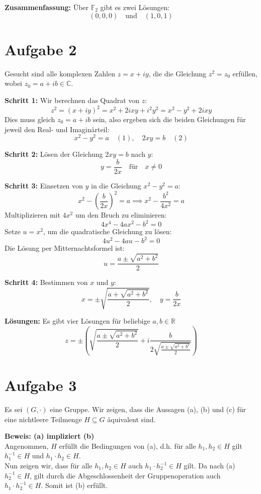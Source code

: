 \documentclass[11pt]{article}
\begin{document}
\textbf{Zusammenfassung:} Über \( \mathbb{F}_2 \) gibt es zwei Lösungen:
\[
(0, 0, 0) \quad \text{und} \quad (1, 0, 1)
\]

\section*{Aufgabe 2}

Gesucht sind alle komplexen Zahlen \( z = x + iy \), die die Gleichung \( z^2 = z_0 \) erfüllen, wobei \( z_0 = a + ib \in \mathbb{C} \).

\textbf{Schritt 1:} Wir berechnen das Quadrat von \( z \):
\[
z^2 = (x + iy)^2 = x^2 + 2ixy + i^2 y^2 = x^2 - y^2 + 2ixy
\]
Dies muss gleich \( z_0 = a + ib \) sein, also ergeben sich die beiden Gleichungen für jeweil den Real- und Imaginärteil:
\[
x^2 - y^2 = a \quad (1), \quad 2xy = b \quad (2)
\]

\textbf{Schritt 2:} Lösen der Gleichung \( 2xy = b \) nach \( y \):
\[
y = \frac{b}{2x} \quad \text{für} \quad x \neq 0
\]

\textbf{Schritt 3:} Einsetzen von \( y \) in die Gleichung \( x^2 - y^2 = a \):
\[
x^2 - \left( \frac{b}{2x} \right)^2 = a \implies x^2 - \frac{b^2}{4x^2} = a
\]
Multiplizieren mit \( 4x^2 \) um den Bruch zu eliminieren:
\[
4x^4 - 4a x^2 - b^2 = 0
\]
Setze \( u = x^2 \), um die quadratische Gleichung zu lösen:
\[
4u^2 - 4a u - b^2 = 0
\]
Die Lösung per Mitternachtsformel ist:
\[
u = \frac{a \pm \sqrt{a^2 + b^2}}{2}
\]

\textbf{Schritt 4:} Bestimmen von \( x \) und \( y \):
\[
x = \pm \sqrt{\frac{a + \sqrt{a^2 + b^2}}{2}}, \quad y = \frac{b}{2x}
\]

\textbf{Lösungen:} Es gibt vier Lösungen für beliebige \( a, b \in \mathbb{R} \)
\[
z = \pm \left( \sqrt{\frac{a \pm \sqrt{a^2 + b^2}}{2}} + i \frac{b}{2 \sqrt{\frac{a \pm \sqrt{a^2 + b^2}}{2}}} \right)
\]

\section*{Aufgabe 3}

Es sei \( (G, \cdot) \) eine Gruppe. Wir zeigen, dass die Aussagen (a), (b) und (c) für eine nichtleere Teilmenge \( H \subseteq G \) äquivalent sind.

\textbf{Beweis: (a) impliziert (b)} \\
Angenommen, \( H \) erfüllt die Bedingungen von (a), d.h. für alle \( h_1, h_2 \in H \) gilt \( h_1^{-1} \in H \) und \( h_1 \cdot h_2 \in H \). \\
Nun zeigen wir, dass für alle \( h_1, h_2 \in H \) auch \( h_1 \cdot h_2^{-1} \in H \) gilt. Da nach (a) \( h_2^{-1} \in H \), gilt durch die Abgeschlossenheit der Gruppenoperation auch \( h_1 \cdot h_2^{-1} \in H \). Somit ist (b) erfüllt.
\medskip
\end{document}

